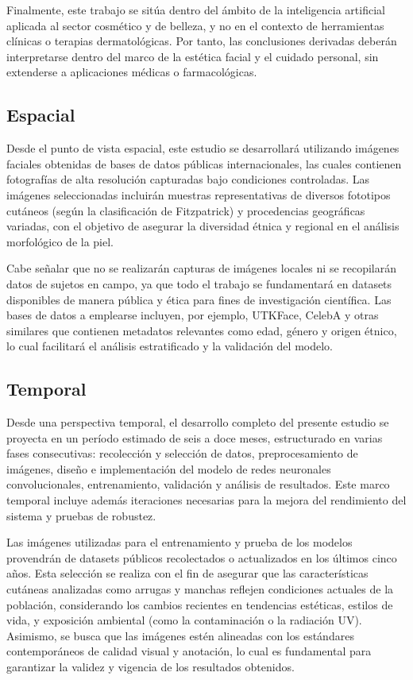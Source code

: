 Finalmente, este trabajo se sitúa dentro del ámbito de la inteligencia artificial aplicada al sector cosmético y de belleza, y no en el contexto de herramientas clínicas o terapias dermatológicas. Por tanto, las conclusiones derivadas deberán interpretarse dentro del marco de la estética facial y el cuidado personal, sin extenderse a aplicaciones médicas o farmacológicas.

\subsection{Espacial}
Desde el punto de vista espacial, este estudio se desarrollará utilizando imágenes faciales obtenidas de bases de datos públicas internacionales, las cuales contienen fotografías de alta resolución capturadas bajo condiciones controladas. Las imágenes seleccionadas incluirán muestras representativas de diversos fototipos cutáneos (según la clasificación de Fitzpatrick) y procedencias geográficas variadas, con el objetivo de asegurar la diversidad étnica y regional en el análisis morfológico de la piel.

Cabe señalar que no se realizarán capturas de imágenes locales ni se recopilarán datos de sujetos en campo, ya que todo el trabajo se fundamentará en datasets disponibles de manera pública y ética para fines de investigación científica. Las bases de datos a emplearse incluyen, por ejemplo, UTKFace, CelebA y otras similares que contienen metadatos relevantes como edad, género y origen étnico, lo cual facilitará el análisis estratificado y la validación del modelo.

\subsection{Temporal}

Desde una perspectiva temporal, el desarrollo completo del presente estudio se proyecta en un período estimado de seis a doce meses, estructurado en varias fases consecutivas: recolección y selección de datos, preprocesamiento de imágenes, diseño e implementación del modelo de redes neuronales convolucionales, entrenamiento, validación y análisis de resultados. Este marco temporal incluye además iteraciones necesarias para la mejora del rendimiento del sistema y pruebas de robustez.

Las imágenes utilizadas para el entrenamiento y prueba de los modelos provendrán de datasets públicos recolectados o actualizados en los últimos cinco años. Esta selección se realiza con el fin de asegurar que las características cutáneas analizadas como arrugas y manchas reflejen condiciones actuales de la población, considerando los cambios recientes en tendencias estéticas, estilos de vida, y exposición ambiental (como la contaminación o la radiación UV). Asimismo, se busca que las imágenes estén alineadas con los estándares contemporáneos de calidad visual y anotación, lo cual es fundamental para garantizar la validez y vigencia de los resultados obtenidos.


